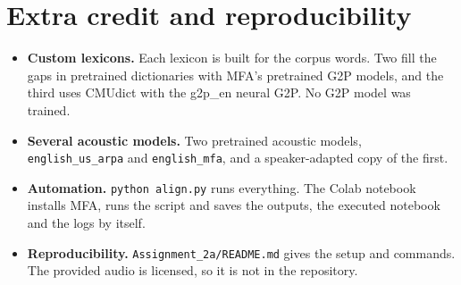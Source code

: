 \documentclass[11pt,a4paper]{article}
\newcommand{\code}[1]{\texttt{#1}}
\begin{document}
\section{Extra credit and reproducibility}
\begin{itemize}
\item \textbf{Custom lexicons.} Each lexicon is built for the corpus words. Two fill the gaps in pretrained dictionaries
  with MFA's pretrained G2P models, and the third uses CMUdict with the g2p\_en neural G2P. No G2P model was trained.
\item \textbf{Several acoustic models.} Two pretrained acoustic models, \code{english\_us\_arpa} and
  \code{english\_mfa}, and a speaker-adapted copy of the first.
\item \textbf{Automation.} \code{python align.py} runs everything. The Colab notebook installs MFA, runs the script and
  saves the outputs, the executed notebook and the logs by itself.
\item \textbf{Reproducibility.} \code{Assignment\_2a/README.md} gives the setup and commands. The provided audio is
  licensed, so it is not in the repository.
\end{itemize}
\end{document}
